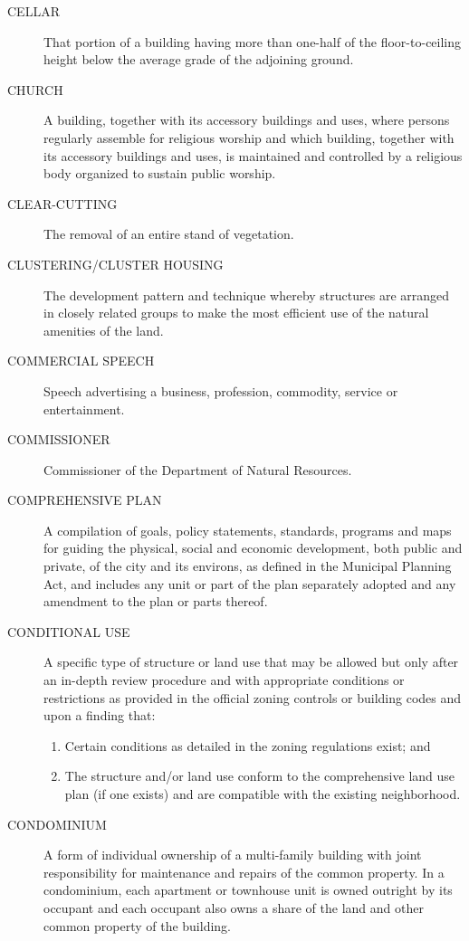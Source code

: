 \begin{description}
    \item[CELLAR] That portion of a building having more than one-half of the floor-to-ceiling height below the average grade of the adjoining ground.
    \item[CHURCH]  A building, together with its accessory buildings and uses, where persons regularly assemble for religious worship and which building, together with its accessory buildings and uses, is maintained and controlled by a religious body organized to sustain public worship.
    \item[CLEAR-CUTTING] The removal of an entire stand of vegetation.
    \item[CLUSTERING/CLUSTER HOUSING] The development pattern and technique whereby structures are arranged in closely related groups to make the most efficient use of the natural amenities of the land.
    \item[COMMERCIAL SPEECH] Speech advertising a business, profession, commodity, service or entertainment.
    \item[COMMISSIONER] Commissioner of the Department of Natural Resources.
    \item[COMPREHENSIVE PLAN] A compilation of goals, policy statements, standards, programs and maps for guiding the physical, social and economic development, both public and private, of the city and its environs, as defined in the Municipal Planning Act, and includes any unit or part of the plan separately adopted and any amendment to the plan or parts thereof.
    \item[CONDITIONAL USE] A specific type of structure or land use that may be allowed but only after an in-depth review procedure and with appropriate conditions or restrictions as provided in the official zoning controls or building codes and upon a finding that:
        \begin{enumerate}
            \item Certain conditions as detailed in the zoning regulations exist; and 
            \item The structure and/or land use conform to the comprehensive land use plan (if one exists) and are compatible with the existing neighborhood.
        \end{enumerate}
    \item[CONDOMINIUM] A form of individual ownership of a multi-family building with joint responsibility for maintenance and repairs of the common property.  In a condominium, each apartment or townhouse unit is owned outright by its occupant and each occupant also owns a share of the land and other common property of the building.

\end{description}
